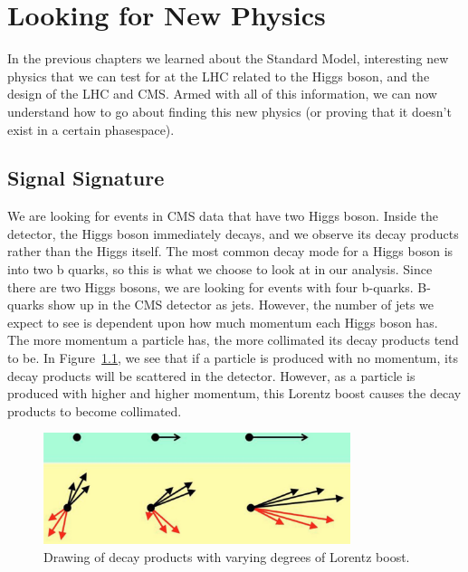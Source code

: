\chapter{Looking for New Physics}\label{Sec:BSM}

In the previous chapters we learned about the Standard Model, interesting new physics that we can test for at the LHC related to the Higgs boson, and the design of the LHC and CMS. Armed with all of this information, we can now understand how to go about finding this new physics (or proving that it doesn't exist in a certain phasespace).
\vspace{5mm}

\section{Signal Signature}

We are looking for events in CMS data that have two Higgs boson. Inside the detector, the Higgs boson immediately decays, and we observe its decay products rather than the Higgs itself. The most common decay mode for a Higgs boson is into two b quarks, so this is what we choose to look at in our analysis. Since there are two Higgs bosons, we are looking for events with four b-quarks. B-quarks show up in the CMS detector as jets. However, the number of jets we expect to see is dependent upon how much momentum each Higgs boson has. The more momentum a particle has, the more collimated its decay products tend to be. In Figure~\ref{Fig:lorentzboost}, we see that if a particle is produced with no momentum, its decay products will be scattered in the detector. However, as a particle is produced with higher and higher momentum, this Lorentz boost causes the decay products to become collimated. 
\begin{figure}[h!]
    \centering
        \includegraphics[width=0.8\textwidth]{F4/boost.png}
        \caption{Drawing of decay products with varying degrees of Lorentz boost.}
        \label{Fig:lorentzboost}
\end{figure}

